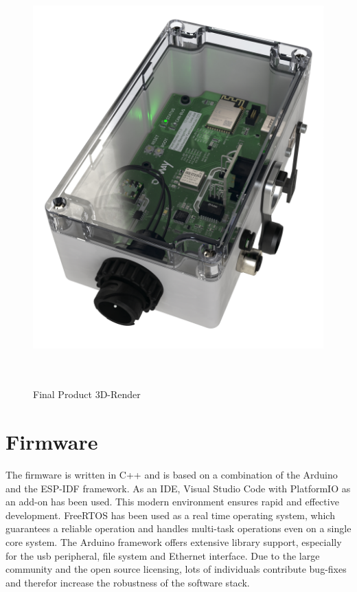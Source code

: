 \medskip
\begin{figure}[h!]
	\centering
	\includegraphics[height=16cm]{images/fleet-monitor-rendering}
	\caption{Final Product 3D-Render}
	\label{fig:fleet-monitor-rendering}
\end{figure}
\newpage

\section{Firmware}
The firmware is written in C++ and is based on a combination of the Arduino and the ESP-IDF framework. As an IDE, Visual Studio Code with PlatformIO as an add-on has been used. This modern environment ensures rapid and effective development.\newline
FreeRTOS has been used as a real time operating system, which guarantees a reliable operation and handles multi-task operations even on a single core system.\newline
The Arduino framework offers extensive library support, especially for the \acrshort{usb} peripheral, file system and Ethernet interface. Due to the large community and the open source licensing, lots of individuals contribute bug-fixes and therefor increase the robustness of the software stack.

